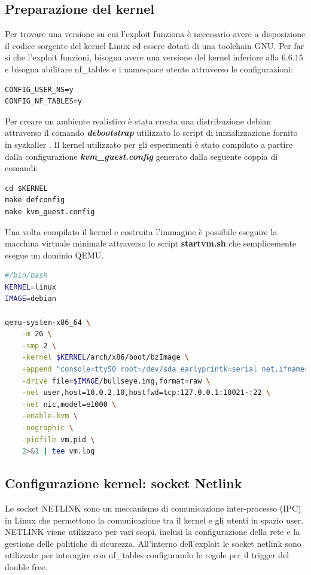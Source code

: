 \documentclass{article}
\begin{document}
\clearpage
\subsection{Preparazione del kernel}
Per trovare una versione su cui l'exploit funziona è necessario avere a disposizione il codice 
sorgente del kernel Linux ed essere dotati di una toolchain GNU. Per far si che l'exploit 
funzioni, bisogna avere una versione del kernel inferiore alla $6.6.15$ e bisogna abilitare 
nf\_tables e i namespace utente attraverso le configurazioni:
\begin{verbatim}
CONFIG_USER_NS=y 
CONFIG_NF_TABLES=y
\end{verbatim}

Per creare un ambiente realistico è stata creata una distribuzione debian attraverso 
il comando \textbf{\textit{debootstrap}} utilizzato lo script di inizializzazione fornito 
in syzkaller \cite{InitScripts}. Il kernel utilizzato per gli esperimenti è stato compilato 
a partire dalla configurazione \textbf{\textit{kvm\_guest.config}} generato dalla seguente 
coppia di comandi:

\begin{verbatim}
cd $KERNEL
make defconfig
make kvm_guest.config 
\end{verbatim}

Una volta compilato il kernel e costruita l'immagine è possibile eseguire la macchina virtuale 
minimale attraverso lo script \textbf{startvm.sh} che semplicemente esegue un dominio QEMU.

\begin{lstlisting}[language=bash,caption="Esecuzione della macchina virtuale vittima"]
#/bin/bash
KERNEL=linux
IMAGE=debian

qemu-system-x86_64 \
	-m 2G \
	-smp 2 \
	-kernel $KERNEL/arch/x86/boot/bzImage \
	-append "console=ttyS0 root=/dev/sda earlyprintk=serial net.ifnames=0" \
	-drive file=$IMAGE/bullseye.img,format=raw \
	-net user,host=10.0.2.10,hostfwd=tcp:127.0.0.1:10021-:22 \
	-net nic,model=e1000 \
	-enable-kvm \
	-nographic \
	-pidfile vm.pid \
	2>&1 | tee vm.log 
\end{lstlisting}
\subsection{Configurazione kernel: socket Netlink}
Le socket NETLINK sono un meccanismo di comunicazione inter-processo (IPC) in Linux che 
permettono la comunicazione tra il kernel e gli utenti in spazio user. NETLINK viene utilizzato
per vari scopi, inclusi la configurazione della rete e la gestione delle politiche di 
sicurezza. All'interno dell'exploit le socket netlink sono utilizzate per interagire con 
nf\_tables configurando le regole per il trigger del double free. 
\end{document}
